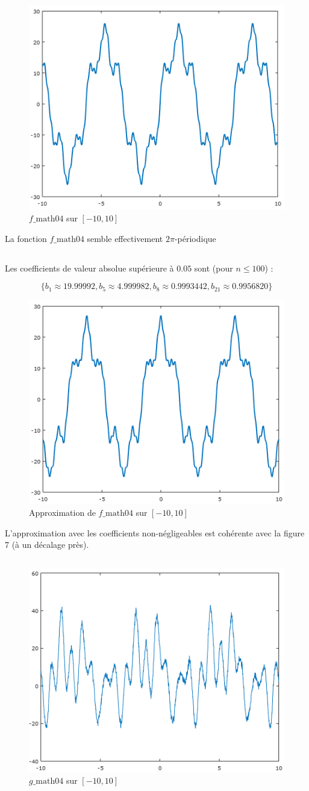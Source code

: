 \documentclass{article}
\begin{document}
\begin{figure}[ht!]
    \centering
    \includegraphics[height=0.35\textwidth]{figures/f_math04.png}
    \caption{$f\_\text{math04}$ sur $[-10, 10]$}
\end{figure}

La fonction $f\_\text{math04}$ semble effectivement $2\pi$-périodique

\subsection{}

Les coefficients de valeur absolue supérieure à $0.05$ sont (pour $n \leq 100$) :

$$\{b_1 \approx 19.99992, b_5 \approx 4.999982, b_8 \approx 0.9993442, b_{21} \approx 0.9956820\}$$

\begin{figure}[ht!]
    \centering
    \includegraphics[height=0.3\textwidth]{figures/approx.png}
    \caption{Approximation de $f\_\text{math04}$ sur $[-10, 10]$}
\end{figure}

L'approximation avec les coefficients non-négligeables est cohérente avec la figure 7 (à un décalage près).

\subsection{}

\begin{figure}[ht!]
    \centering
    \includegraphics[height=0.3\textwidth]{figures/g_math04.png}
    \caption{$g\_\text{math04}$ sur $[-10, 10]$}
\end{figure}
\end{document}
